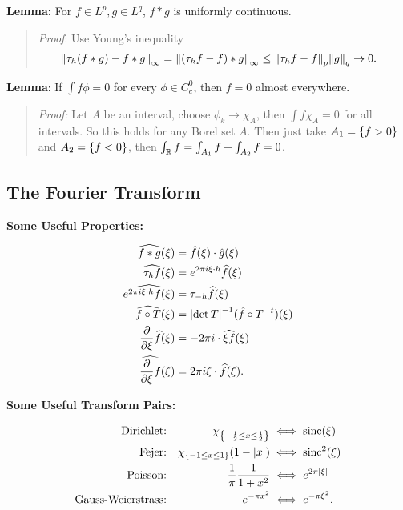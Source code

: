 \textbf{Lemma:} For \(f\in L^p, g\in L^q\), \(f\ast g\) is uniformly
continuous.

\begin{quote}
\emph{Proof}: Use Young's inequality \begin{align*}
{\left\lVert {\tau_h(f\ast g) - f\ast g} \right\rVert}_\infty
&= {\left\lVert {(\tau_h f - f) \ast g} \right\rVert}_\infty \leq {\left\lVert {\tau_hf - f} \right\rVert}_p {\left\lVert {g} \right\rVert}_q \to 0
.\end{align*}
\end{quote}

\textbf{Lemma}: If \(\int f \phi = 0\) for every \(\phi \in C_c^0\),
then \(f = 0\) almost everywhere.

\begin{quote}
\emph{Proof:} Let \(A\) be an interval, choose \(\phi_k \to \chi_A\),
then \(\int f \chi_A = 0\) for all intervals. So this holds for any
Borel set \(A\). Then just take \(A_1 = \left\{{f > 0}\right\}\) and
\(A_2 = \left\{{f < 0}\right\}\), then
\(\int_{\mathbb{R}} f = \int_{A_1} f + \int_{A_2}f = 0\).
\end{quote}

\hypertarget{the-fourier-transform}{%
\subsection{The Fourier Transform}\label{the-fourier-transform}}

\textbf{Some Useful Properties:}

\begin{align*}
\widehat{f\ast g}(\xi)
&= \hat f(\xi) \cdot \hat g (\xi) \\
\widehat{\tau_h f}(\xi)
&= e^{2\pi i \xi \cdot h}\widehat{f}(\xi) \\
\widehat{e^{2\pi i \xi \cdot h}f(\xi)}
&= \tau_{-h}\widehat f(\xi) \\
\widehat{f \circ T}(\xi)
&= {\left\lvert {\det T} \right\rvert}^{-1} (\hat f \circ T^{-t})(\xi) \\
{\frac{\partial }{\partial \xi}} \widehat{f}(\xi)
&= -2\pi i \cdot \widehat {\xi f} (\xi) \\
\widehat{{\frac{\partial }{\partial \xi}} f}(\xi)
&= 2\pi i \xi \cdot \widehat{f}(\xi)
.\end{align*}

\textbf{Some Useful Transform Pairs:}

\begin{align*}
\text{Dirichlet:}
&& \chi_{\left\{{-\frac{1}{2} \leq x \leq \frac{1}{2}}\right\}}
&\iff \mathrm{sinc}(\xi) \\
\text{Fejer:}
&& \chi_{\left\{{-1 \leq x \leq 1}\right\}} (1 - {\left\lvert {x} \right\rvert})
&\iff \mathrm{sinc}^2(\xi) \\
\text{Poisson:}
&& \frac{1}{\pi} \frac{1}{1+x^2}
&\iff e^{2\pi {\left\lvert {\xi} \right\rvert}} \\
\text{Gauss-Weierstrass:}
&& e^{-\pi x^2}
&\iff e^{-\pi \xi^2}
.\end{align*}





